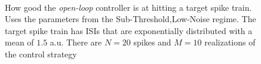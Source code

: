 \documentclass[12pt]{iopart}
\begin{document}
\begin{figure}[htp]
\begin{center}
\\
  \caption[ ]{How good the {\sl open-loop} controller is at hitting a target
  spike train. Uses the parameters from the Sub-Threshold,Low-Noise regime. The
  target spike train has ISIs that are exponentially distributed with a
  mean of $1.5$ a.u. There are $N=20$ spikes and $M=10$ realizations of the
  control strategy}
  \label{fig:targettrain_ol_lownoise}
\end{center}
\end{figure}
\end{document}
